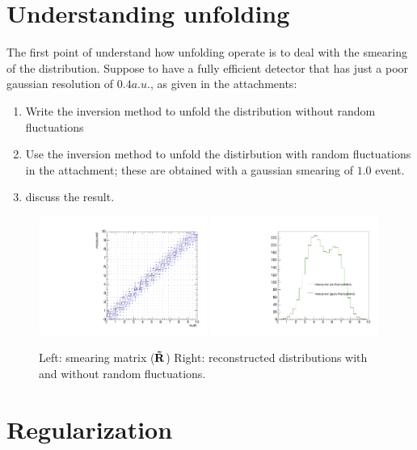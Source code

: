 \documentclass[a4paper,11pt]{article}
\begin{document}
\section{Understanding unfolding}

The first point of understand how unfolding operate is to deal with the smearing of the distribution.
Suppose to have a fully efficient detector that has just a poor gaussian resolution of $0.4 a.u.$, as given in the attachments:
\begin{enumerate}
	\item Write the inversion method to unfold the distribution without random fluctuations
	\item Use the inversion method to unfold the distirbution with random fluctuations in the attachment; these are obtained with a gaussian smearing of $1.0$ event.
	\item discuss the result.
\end{enumerate}
\begin{figure}[H]
	\includegraphics[width=0.49\textwidth]{figs/respt.pdf}
	\includegraphics[width=0.49\textwidth]{figs/reco.pdf}
	\caption{
		\label{fig:exe1}
		Left: smearing matrix ($\mathbf{\tilde{R}}$) 
		Right: reconstructed distributions with and without random fluctuations.
	}	
\end{figure}
\FloatBarrier

\section{Regularization}
\end{document}
